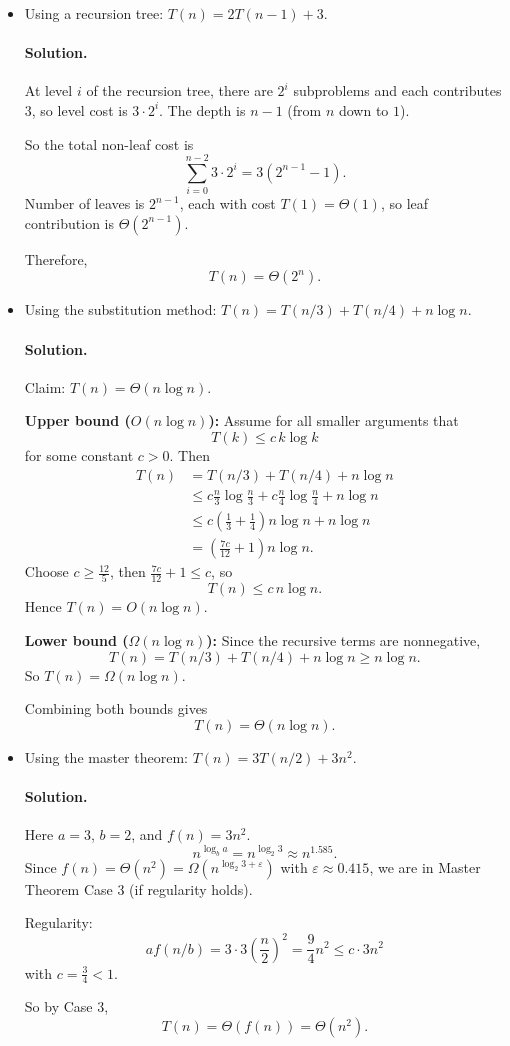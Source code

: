 \documentclass[10pt]{article}
\begin{document}
\begin{itemize}
    \item Using a recursion tree:  $T(n) = 2T(n-1) + 3$.
\paragraph{Solution.}
At level $i$ of the recursion tree, there are $2^i$ subproblems and each contributes $3$, so level cost is $3\cdot 2^i$.
The depth is $n-1$ (from $n$ down to $1$).

So the total non-leaf cost is
\[
\sum_{i=0}^{n-2} 3\cdot 2^i = 3(2^{n-1}-1).
\]
Number of leaves is $2^{n-1}$, each with cost $T(1)=\Theta(1)$, so leaf contribution is $\Theta(2^{n-1})$.

Therefore,
\[
T(n)=\Theta(2^n).
\]

    \item Using the substitution method:  $T(n) = T(n/3) + T(n/4) + n\log{n}$.
\paragraph{Solution.}
Claim: $T(n)=\Theta(n\log n)$.

\textbf{Upper bound ($O(n\log n)$):} Assume for all smaller arguments that
\[
T(k)\le c\,k\log k
\]
for some constant $c>0$. Then
\[
\begin{aligned}
T(n)
&=T(n/3)+T(n/4)+n\log n\\
&\le c\frac n3\log\frac n3 + c\frac n4\log\frac n4 + n\log n\\
&\le c\left(\frac 13+\frac 14\right)n\log n + n\log n\\
&=\left(\frac{7c}{12}+1\right)n\log n.
\end{aligned}
\]
Choose $c\ge \frac{12}{5}$, then $\frac{7c}{12}+1\le c$, so
\[
T(n)\le c\,n\log n.
\]
Hence $T(n)=O(n\log n)$.

\textbf{Lower bound ($\Omega(n\log n)$):}
Since the recursive terms are nonnegative,
\[
T(n)=T(n/3)+T(n/4)+n\log n \ge n\log n.
\]
So $T(n)=\Omega(n\log n)$.

Combining both bounds gives
\[
T(n)=\Theta(n\log n).
\]

    \item Using the master theorem:  $T(n) = 3T(n/2) + 3n^2$.
\paragraph{Solution.}
Here $a=3$, $b=2$, and $f(n)=3n^2$.
\[
n^{\log_b a}=n^{\log_2 3}\approx n^{1.585}.
\]
Since $f(n)=\Theta(n^2)=\Omega(n^{\log_2 3+\varepsilon})$ with $\varepsilon\approx 0.415$, we are in Master Theorem Case 3 (if regularity holds).

Regularity:
\[
a f(n/b)=3\cdot 3\left(\frac n2\right)^2=\frac{9}{4}n^2\le c\cdot 3n^2
\]
with $c=\frac34<1$.

So by Case 3,
\[
T(n)=\Theta(f(n))=\Theta(n^2).
\]
\end{itemize}
\end{document}
